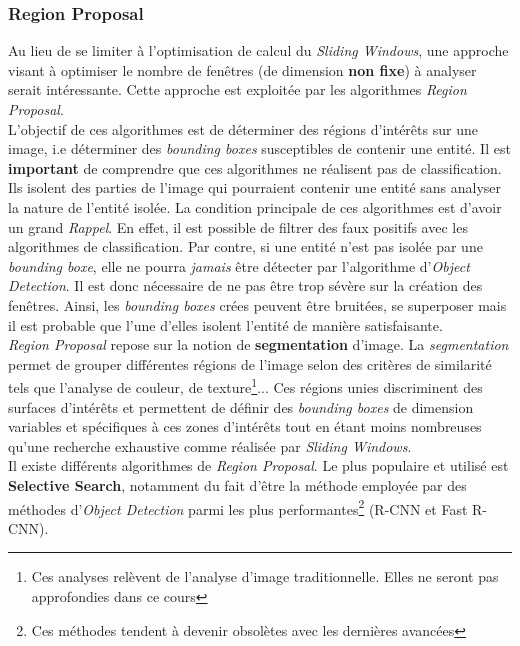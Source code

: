 \subsubsection{Region Proposal}
Au lieu de se limiter à l'optimisation de calcul du \textit{Sliding Windows}, une approche visant à optimiser le nombre de fenêtres (de dimension \textbf{non fixe}) à analyser serait intéressante. Cette approche est exploitée par les algorithmes \textit{Region Proposal}.\\

\noindent L'objectif de ces algorithmes est de déterminer des régions d'intérêts sur une image, i.e déterminer des \textit{bounding boxes} susceptibles de contenir une entité. Il est \textbf{important} de comprendre que ces algorithmes ne réalisent pas de classification. Ils isolent des parties de l'image qui pourraient contenir une entité sans analyser la nature de l'entité isolée. La condition principale de ces algorithmes est d'avoir un grand \textit{Rappel}. En effet, il est possible de filtrer des faux positifs avec les algorithmes de classification. Par contre, si une entité n'est pas isolée par une \textit{bounding boxe}, elle ne pourra \textit{jamais} être détecter par l'algorithme d'\textit{Object Detection}. Il est donc nécessaire de ne pas être trop sévère sur la création des fenêtres. Ainsi, les \textit{bounding boxes} crées peuvent être bruitées, se superposer mais il est probable que l'une d'elles isolent l'entité de manière satisfaisante.\\

\noindent \textit{Region Proposal} repose sur la notion de \textbf{segmentation} d'image. La \textit{segmentation} permet de grouper différentes régions de l'image selon des critères de similarité tels que l'analyse de couleur, de texture\footnote{Ces analyses relèvent de l'analyse d'image traditionnelle. Elles ne seront pas approfondies dans ce cours}... Ces régions unies discriminent des surfaces d'intérêts et permettent de définir des \textit{bounding boxes} de dimension variables et spécifiques à ces zones d'intérêts tout en étant moins nombreuses qu'une recherche exhaustive comme réalisée par \textit{Sliding Windows}.\\

\noindent Il existe différents algorithmes de \textit{Region Proposal}. Le plus populaire et utilisé est \textbf{Selective Search}, notamment du fait d'être la méthode employée par des méthodes d'\textit{Object Detection} parmi les plus performantes\footnote{Ces méthodes tendent à devenir obsolètes avec les dernières avancées} (R-CNN et Fast R-CNN).

